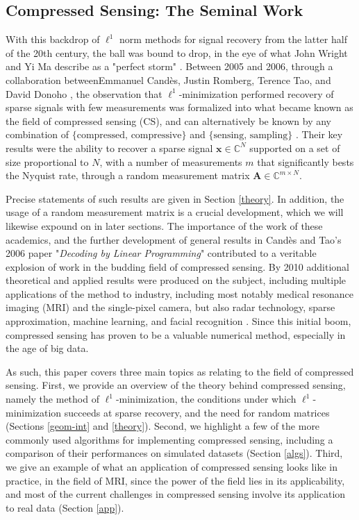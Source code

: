 \documentclass[12pt,a4paper]{amsart}
\numberwithin{equation}{section}
\theoremstyle{plain}
\theoremstyle{definition}
\newcommand{\BC}{\mathbb C}
\newcommand{\bdx}{\mathbf{x}}
\newcommand{\bdA}{\mathbf{A}}
\begin{document}
\subsection*{Compressed Sensing: The Seminal Work}

With this backdrop of $\ell^1$ norm methods for signal recovery from the latter half of the 20th century, the ball was bound to drop, in the eye of what John Wright and Yi Ma describe as a "perfect storm" \cite{wm}. Between 2005 and 2006, through a collaboration betweenEmmanuel Cand\`{e}s, Justin Romberg, Terence Tao, and David Donoho \cite{candes, donoho}, the observation that $\ell^1$-minimization performed recovery of sparse signals with few measurements was formalized into what became known as the field of compressed sensing (CS), and can alternatively be known by any combination of $\{\text{compressed, compressive}\}$ and $\{\text{sensing, sampling}\}$ \cite{fou-rau,wm}. Their key results were the ability to recover a sparse signal $\bdx\in\BC^N$ supported on a set of size proportional to $N$, with a number of measurements $m$ that significantly bests the Nyquist rate, through a random measurement matrix $\bdA\in\BC^{m\times N}$. 

Precise statements of such results are given in Section \ref{theory}. In addition, the usage of a random measurement matrix is a crucial development, which we will likewise expound on in later sections. The importance of the work of these academics, and the further development of general results in Cand\`{e}s and Tao's 2006 paper "\textit{Decoding by Linear Programming}" contributed to a veritable explosion of work in the budding field of compressed sensing. By 2010 additional theoretical and applied results were produced on the subject, including multiple applications of the method to industry, including most notably medical resonance imaging (MRI) and the single-pixel camera, but also radar technology, sparse approximation, machine learning, and facial recognition \cite{fou-rau, wm}. Since this initial boom, compressed sensing has proven to be a valuable numerical method, especially in the age of big data.

As such, this paper covers three main topics as relating to the field of compressed sensing. First, we provide an overview of the theory behind compressed sensing, namely the method of $\ell^1$-minimization, the conditions under which $\ell^1$-minimization succeeds at sparse recovery, and the need for random matrices (Sections \ref{geom-int} and \ref{theory}). Second, we highlight a few of the more commonly used algorithms for implementing compressed sensing, including a comparison of their performances on simulated datasets (Section \ref{algs}). Third, we give an example of what an application of compressed sensing looks like in practice, in the field of MRI, since the power of the field lies in its applicability, and most of the current challenges in compressed sensing involve its application to real data (Section \ref{app}).
\end{document}
